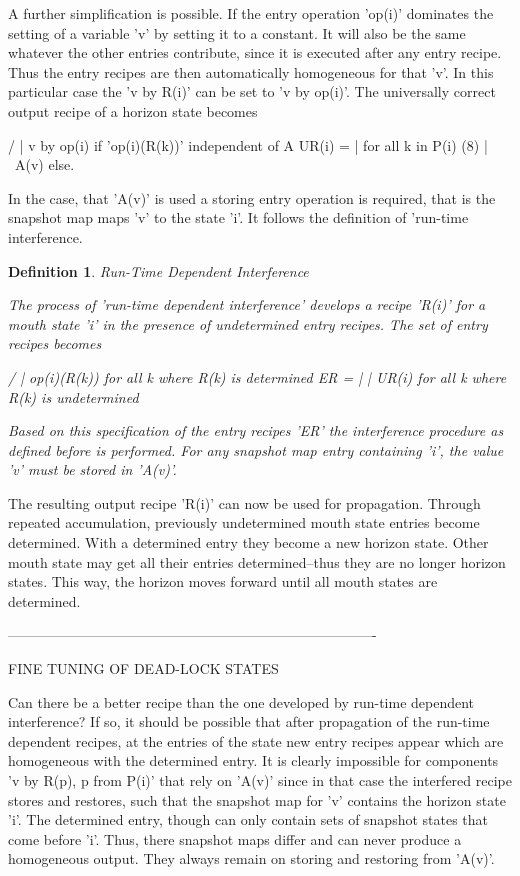 \documentclass[12pt]{article}
\newtheorem{definition}{Definition}
\begin{document}
A further simplification is possible. If the entry operation 'op(i)' dominates
the setting of a variable 'v' by setting it to a constant.  It will also be the
same whatever the other entries contribute, since it is executed after any
entry recipe. Thus the entry recipes are then automatically homogeneous for
that 'v'. In this particular case the 'v by R(i)' can be set to 'v by op(i)'.
The universally correct output recipe of a horizon state becomes 

                  /
                  |   v by op(i)    if 'op(i)(R(k))' independent of A
          UR(i) = |                     for all k in P(i)                   (8)
                  |
                  \   A(v)          else.

In the case, that 'A(v)' is used a storing entry operation is required, that is
the snapshot map maps 'v' to the state 'i'. It follows the definition of
'run-time interference.

\begin{definition}
Run-Time Dependent Interference

    The process of 'run-time dependent interference' develops a recipe 'R(i)'
    for a mouth state 'i' in the presence of undetermined entry recipes. The
    set of entry recipes becomes

            /
            |   op(i)(R(k))  for all k where R(k) is determined
       ER = | 
            |   UR(i)        for all k where R(k) is undetermined
            \             

    Based on this specification of the entry recipes 'ER' the interference
    procedure as defined before is performed. For any snapshot map entry
    containing 'i', the value 'v' must be stored in 'A(v)'.
\end{definition}

The resulting output recipe 'R(i)' can now be used for propagation. Through
repeated accumulation, previously undetermined mouth state entries become
determined. With a determined entry they become a new horizon state. Other
mouth state may get all their entries determined--thus they are no longer
horizon states. This way, the horizon moves forward until all mouth states are
determined. 

-------------------------------------------------------------------------------

FINE TUNING OF DEAD-LOCK STATES

Can there be a better recipe than the one developed by run-time dependent
interference? If so, it should be possible that after propagation of the
run-time dependent recipes, at the entries of the state new entry recipes
appear which are homogeneous with the determined entry. It is clearly
impossible for components 'v by R(p), p from P(i)' that rely on 'A(v)' since in
that case the interfered recipe stores and restores, such that the snapshot map
for 'v' contains the horizon state 'i'. The determined entry, though can only
contain sets of snapshot states that come before 'i'. Thus, there snapshot maps
differ and can never produce a homogeneous output. They always remain on
storing and restoring from 'A(v)'.
\end{document}
